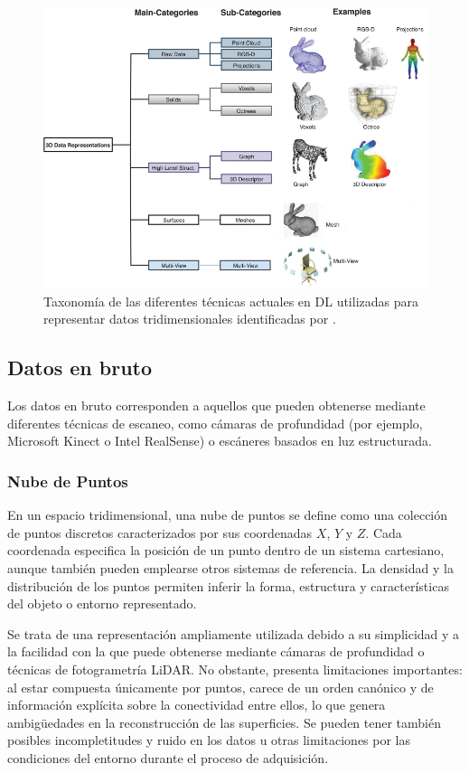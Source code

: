 \begin{figure}[h]
    \centering
    \includegraphics[width=\linewidth]{figures/2_theory/3Dtaxonomy.png}
    \caption[Taxonomía de las representaciones 3D para Deep Learning]{Taxonomía de las diferentes técnicas actuales en DL utilizadas para representar datos tridimensionales identificadas por \cite{gezawa_review_2020}.}
    \label{fig:3dTaxonomy}
\end{figure}

\subsection{Datos en bruto}
Los datos en bruto corresponden a aquellos que pueden obtenerse mediante diferentes técnicas de escaneo, como cámaras de profundidad (por ejemplo, Microsoft Kinect o Intel RealSense) o escáneres basados en luz estructurada.

\subsubsection{Nube de Puntos}
En un espacio tridimensional, una nube de puntos se define como una colección de puntos discretos caracterizados por sus coordenadas $X$, $Y$ y $Z$. Cada coordenada especifica la posición de un punto dentro de un sistema cartesiano, aunque también pueden emplearse otros sistemas de referencia. La densidad y la distribución de los puntos permiten inferir la forma, estructura y características del objeto o entorno representado.

Se trata de una representación ampliamente utilizada debido a su simplicidad y a la facilidad con la que puede obtenerse mediante cámaras de profundidad o técnicas de fotogrametría LiDAR. No obstante, presenta limitaciones importantes: al estar compuesta únicamente por puntos, carece de un orden canónico y de información explícita sobre la conectividad entre ellos, lo que genera ambigüedades en la reconstrucción de las superficies. Se pueden tener también posibles incompletitudes y ruido en los datos u otras limitaciones por las condiciones del entorno durante el proceso de adquisición.

